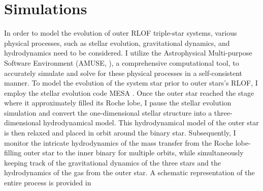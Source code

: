 \chapter{Simulations}


In order to model the evolution of outer RLOF triple-star systems, various physical processes, such as stellar evolution, gravitational dynamics, and hydrodynamics need to be considered. I utilize the Astrophysical Multi-purpose Software Environment (AMUSE, \cite{portegies2018astrophysical}), a comprehensive computational tool, to accurately simulate and solve for these physical processes in a self-consistent manner. To model the evolution of the system star prior to outer stars's RLOF, I employ the stellar evolution code MESA \citep{paxton2010modules,paxton2013modules,paxton2015modules,paxton2019modules}. Once the outer star reached the stage where it approximately filled its Roche lobe, I pause the stellar evolution simulation and convert the one-dimensional stellar structure into a three-dimensional hydrodynamical model. This hydrodynamical model of the outer star is then relaxed and placed in orbit around the binary star. Subsequently, I monitor the intricate hydrodynamics of the mass transfer from the Roche lobe-filling outer star to the inner binary for multiple orbits, while simultaneously keeping track of the gravitational dynamics of the three stars and the hydrodynamics of the gas from the outer star. A schematic representation of the entire process is provided in 





